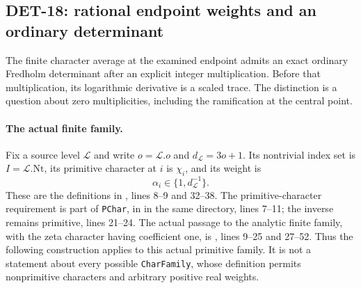 \subsection{DET-18: rational endpoint weights and an ordinary determinant}
The finite character average at the examined endpoint admits an exact
ordinary Fredholm determinant after an explicit integer multiplication.
Before that multiplication, its logarithmic derivative is a scaled trace.
The distinction is a question about zero multiplicities, including the
ramification at the central point.

\paragraph{The actual finite family.}
Fix a source level $\mathcal L$ and write $o=\mathcal L.o$ and
$d_{\mathcal L}=3o+1$. Its nontrivial index set is
$I=\mathcal L.\mathrm{Nt}$, its primitive character at $i$ is $\chi_i$,
and its weight is
\[
 \alpha_i\in\{1,d_{\mathcal L}^{-1}\}.
\]
These are the definitions in
,
lines 8--9 and 32--38.
The primitive-character requirement is part of \texttt{PChar}, in
 in the same directory, lines 7--11;
the inverse remains primitive, lines 21--24.
The actual passage to the analytic finite family, with the zeta character
having coefficient one, is
,
lines 9--25 and 27--52.
Thus the following construction applies to this actual primitive family.
It is not a statement about every possible \texttt{CharFamily}, whose
definition permits nonprimitive characters and arbitrary positive real
weights.

